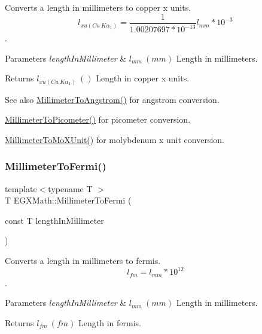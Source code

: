 Converts a length in millimeters to copper x units. \[ l_{xu(Cu\ K\alpha_1)}= \frac{1}{1.00207697*10^{-13}} l_{mm} * 10^{-3}\]. 


\begin{DoxyParams}{Parameters}
{\em length\+In\+Millimeter} & $ l_{mm}\ (mm)$ Length in millimeters. \\
\hline
\end{DoxyParams}
\begin{DoxyReturn}{Returns}
$ l_{xu(Cu\ K\alpha_1)}\ ()$ Length in copper x units. 
\end{DoxyReturn}
\begin{DoxySeeAlso}{See also}
\mbox{\hyperlink{group___e_g_x_math-_conversions-_length_conversions-_millimeter-_non-_s_i_ga40e4659f4689e5be54f8e28fd8ce0008}{Millimeter\+To\+Angstrom()}} for angstrom conversion. 

\mbox{\hyperlink{group___e_g_x_math-_conversions-_length_conversions-_millimeter-_s_i_ga679e3714c229f1355a5c9bf707fcd723}{Millimeter\+To\+Picometer()}} for picometer conversion. 

\mbox{\hyperlink{group___e_g_x_math-_conversions-_length_conversions-_millimeter-_non-_s_i_ga1f0be98bc702f46a69579b27e05a2439}{Millimeter\+To\+Mo\+X\+Unit()}} for molybdenum x unit conversion. 
\end{DoxySeeAlso}
\mbox{\label{group___e_g_x_math-_conversions-_length_conversions-_millimeter-_non-_s_i_gaeb57dff8b2e092b5a655ffdd9960897d}} 
\subsubsection{\texorpdfstring{Millimeter\+To\+Fermi()}{MillimeterToFermi()}}
{\footnotesize\ttfamily template$<$typename T $>$ \\
T E\+G\+X\+Math\+::\+Millimeter\+To\+Fermi (\begin{DoxyParamCaption}\item[{const T}]{length\+In\+Millimeter }\end{DoxyParamCaption})}



Converts a length in millimeters to fermis. \[ l_{fm}=l_{mm} * 10^{12} \]. 


\begin{DoxyParams}{Parameters}
{\em length\+In\+Millimeter} & $ l_{mm}\ (mm)$ Length in millimeters. \\
\hline
\end{DoxyParams}
\begin{DoxyReturn}{Returns}
$ l_{fm}\ (fm)$ Length in fermis. 
\end{DoxyReturn}
\mbox{\label{group___e_g_x_math-_conversions-_length_conversions-_millimeter-_non-_s_i_ga47eac74d2eeec20afc801e61d53f67a0}} 
